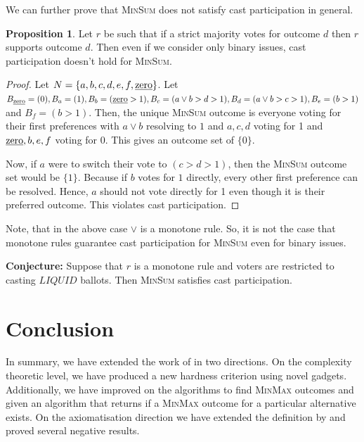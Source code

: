 \documentclass[11pt,a4paper, titlepage]{article}
\theoremstyle{definition}
\newtheorem{proposition}[theorem]{Proposition}
\newcommand{\LIQUID}{\mathit{LIQUID}}
\begin{document}
We can further prove that \textsc{MinSum} does not satisfy cast participation in general.

\begin{proposition} \label{prop:cast-sum}
    Let $r$ be such that if a strict majority votes for outcome $d$ then $r$ supports outcome $d$. Then even if we consider only binary issues, cast participation doesn't hold for \textsc{MinSum}. 
\end{proposition}

\begin{proof}
    Let $N = \{a, b, c, d, e, f, \text{\underline{zero}}\}$. Let $B_\text{\underline{zero}} = (0), B_a = (1), B_b = (\text{\underline{zero}} > 1), B_c = (a \lor b > d > 1), B_d = (a \lor b > c > 1), B_e = (b > 1)$ and $B_f = (b > 1)$. Then, the unique \textsc{MinSum} outcome is everyone voting for their first preferences with $a \lor b$ resolving to $1$ and $a, c, d$ voting for 1 and $\text{\underline{zero}}, b, e, f$ voting for 0. This gives an outcome set of $\{0\}$.

    Now, if $a$ were to switch their vote to $(c > d > 1)$, then the \textsc{MinSum} outcome set would be $\{1\}$. Because if $b$ votes for $1$ directly, every other first preference can be resolved.
    Hence, $a$ should not vote directly for 1 even though it is their preferred outcome. This violates cast participation.
\end{proof}

Note, that in the above case $\lor$ is a monotone rule. So, it is not the case that monotone rules guarantee cast participation for \textsc{MinSum} even for binary issues.

\textbf{Conjecture:}
    Suppose that $r$ is a monotone rule and voters are restricted to casting $\LIQUID$ ballots. Then \textsc{MinSum} satisfies cast participation.

\newpage
\section{Conclusion}

In summary, we have extended the work of \citet{grandi} in two directions. On the complexity theoretic level, we have produced a new hardness criterion using novel gadgets. Additionally, we have improved on the algorithms to find \textsc{MinMax} outcomes and given an algorithm that returns if a \textsc{MinMax} outcome for a particular alternative exists.
On the axiomatisation direction we have extended the definition by \citeauthor{grandi} and proved several negative results.
\end{document}
